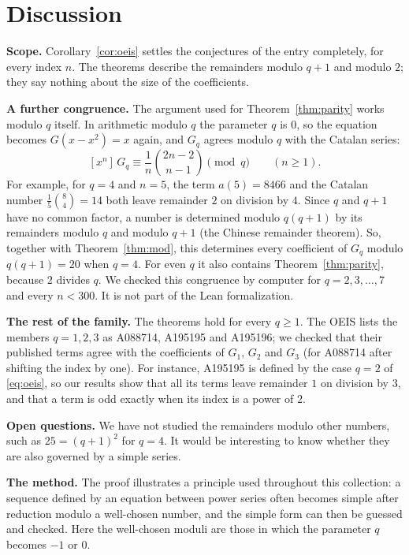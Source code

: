 \documentclass[11pt,a4paper]{article}
\theoremstyle{definition}
\theoremstyle{remark}
\newcommand{\coeff}[2]{[x^{#1}]\,#2}
\newcommand{\para}[1]{\par\medskip\noindent\textbf{#1}\enspace}
\begin{document}
\section{Discussion}\label{sec:discussion}

\para{Scope.} Corollary~\ref{cor:oeis} settles the conjectures of the entry completely,
for every index $n$. The theorems describe the remainders modulo $q+1$ and modulo $2$; they say nothing about the size
of the coefficients.

\para{A further congruence.} The argument used for Theorem~\ref{thm:parity} works modulo $q$ itself. In arithmetic
modulo $q$ the parameter $q$ is $0$, so the equation becomes $G(x-x^2)=x$ again, and $G_q$ agrees modulo $q$ with the
Catalan series:
\[
\coeff{n}{G_q}\equiv\frac{1}{n}\binom{2n-2}{n-1}\pmod q\qquad(n\ge1).
\]
For example, for $q=4$ and $n=5$, the term $a(5)=8466$ and the Catalan number $\frac15\binom84=14$ both leave remainder $2$ on division by $4$. Since $q$ and $q+1$ have no common factor, a number is determined modulo $q(q+1)$ by its
remainders modulo $q$ and modulo $q+1$ (the Chinese remainder theorem). So, together with Theorem~\ref{thm:mod}, this
determines every coefficient of $G_q$ modulo $q(q+1)=20$ when $q=4$. For even $q$ it also contains Theorem~\ref{thm:parity}, because $2$ divides $q$. We checked
this congruence by computer for $q=2,3,\dots,7$ and every $n<300$. It is not part of the Lean formalization.

\para{The rest of the family.} The theorems hold for every $q\ge1$. The OEIS lists the members $q=1,2,3$ as A088714,
A195195 and A195196; we checked that their published terms agree with the coefficients of $G_1$, $G_2$ and $G_3$ (for
A088714 after shifting the index by one). For instance, A195195 is defined by the case $q=2$ of
\eqref{eq:oeis}, so our results show that all its terms leave remainder $1$ on division by $3$, and that a term is odd
exactly when its index is a power of $2$.

\para{Open questions.} We have not studied the remainders modulo other numbers, such as $25=(q+1)^2$
for $q=4$. It would be interesting to know whether they are also governed by a simple series.

\para{The method.} The proof illustrates a principle used throughout this collection: a sequence defined by an
equation between power series often becomes simple after reduction modulo a well-chosen number, and the simple form can
then be guessed and checked. Here the well-chosen moduli are those in which the parameter $q$ becomes $-1$ or $0$.
\end{document}
